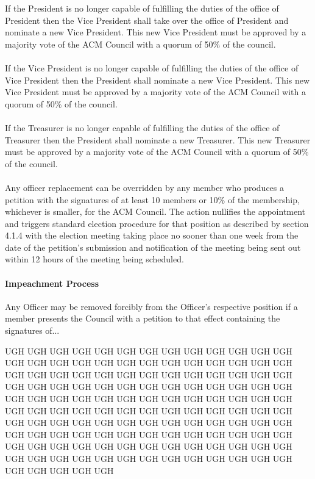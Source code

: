 \documentclass[12pt,titlepage]{article}
\begin{document}
If the President is no longer capable of fulfilling the duties of the office of President then the Vice President shall take over the office of President and nominate a new Vice President. This new Vice President must be approved by a majority vote of the ACM Council with a quorum of 50\% of the council.\\
\\
If the Vice President is no longer capable of fulfilling the duties of the office of Vice President then the President shall nominate a new Vice President. This new Vice President must be approved by a majority vote of the ACM Council with a quorum of 50\% of the council.\\
\\
If the Treasurer is no longer capable of fulfilling the duties of the office of Treasurer then the President shall nominate a new Treasurer. This new Treasurer must be approved by a majority vote of the ACM Council with a quorum of 50\% of the council.\\
\\
Any officer replacement can be overridden by any member who produces a petition with the signatures of at least 10 members or 10\% of the membership, whichever is smaller, for the ACM Council. The action nullifies the appointment and triggers standard election procedure for that position as described by section 4.1.4 with the election meeting taking place no sooner than one week from the date of the petition's submission and notification of the meeting being sent out within 12 hours of the meeting being scheduled.

\paragraph{Impeachment Process}

Any Officer may be removed forcibly from the Officer's respective position if a member presents the Council with a petition to that effect containing the signatures of...

    UGH UGH UGH UGH UGH UGH UGH UGH UGH UGH UGH UGH UGH UGH UGH UGH UGH UGH UGH UGH UGH UGH UGH UGH UGH UGH UGH 
    UGH UGH UGH UGH UGH UGH UGH UGH UGH UGH UGH UGH UGH UGH UGH UGH UGH UGH UGH UGH UGH UGH UGH UGH UGH UGH UGH 
    UGH UGH UGH UGH UGH UGH UGH UGH UGH UGH UGH UGH UGH UGH UGH UGH UGH UGH UGH UGH UGH UGH UGH UGH UGH UGH UGH 
    UGH UGH UGH UGH UGH UGH UGH UGH UGH UGH UGH UGH UGH UGH UGH UGH UGH UGH UGH UGH UGH UGH UGH UGH UGH UGH UGH 
    UGH UGH UGH UGH UGH UGH UGH UGH UGH UGH UGH UGH UGH UGH UGH UGH UGH UGH UGH UGH UGH UGH UGH UGH UGH UGH UGH 
\end{document}
